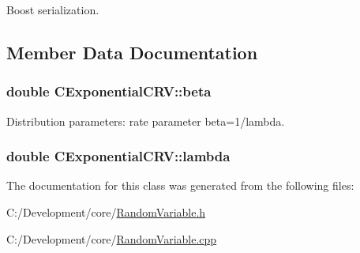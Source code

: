 Boost serialization. 



\subsection{Member Data Documentation}
\hypertarget{class_c_exponential_c_r_v_a29435872622b1a114b3c5c3717239fd2}{
\subsubsection[{beta}]{\setlength{\rightskip}{0pt plus 5cm}double C\-Exponential\-C\-R\-V\-::beta\hspace{0.3cm}{\ttfamily [private]}}}\label{class_c_exponential_c_r_v_a29435872622b1a114b3c5c3717239fd2}
Distribution parameters\-: rate parameter beta=1/lambda. \hypertarget{class_c_exponential_c_r_v_a4bae65d53141f778e4a324f70c4658b1}{
\subsubsection[{lambda}]{\setlength{\rightskip}{0pt plus 5cm}double C\-Exponential\-C\-R\-V\-::lambda\hspace{0.3cm}{\ttfamily [private]}}}\label{class_c_exponential_c_r_v_a4bae65d53141f778e4a324f70c4658b1}


The documentation for this class was generated from the following files\-:\begin{DoxyCompactItemize}
\item 
C\-:/\-Development/core/\hyperlink{_random_variable_8h}{Random\-Variable.\-h}\item 
C\-:/\-Development/core/\hyperlink{_random_variable_8cpp}{Random\-Variable.\-cpp}\end{DoxyCompactItemize}
